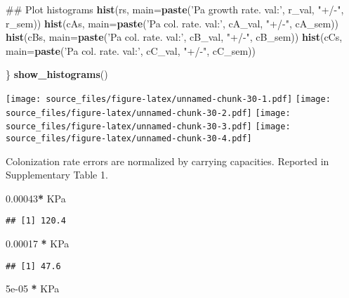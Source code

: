 \documentclass[]{article}
\newenvironment{Shaded}{\begin{snugshade}}{\end{snugshade}}
\newcommand{\KeywordTok}[1]{\textcolor[rgb]{0.13,0.29,0.53}{\textbf{#1}}}
\newcommand{\DataTypeTok}[1]{\textcolor[rgb]{0.13,0.29,0.53}{#1}}
\newcommand{\FloatTok}[1]{\textcolor[rgb]{0.00,0.00,0.81}{#1}}
\newcommand{\StringTok}[1]{\textcolor[rgb]{0.31,0.60,0.02}{#1}}
\newcommand{\OperatorTok}[1]{\textcolor[rgb]{0.81,0.36,0.00}{\textbf{#1}}}
\newcommand{\NormalTok}[1]{#1}
\begin{document}
\begin{Shaded}
\begin{Highlighting}[]
\NormalTok{  ## Plot histograms}
  \KeywordTok{hist}\NormalTok{(rs, }\DataTypeTok{main=}\KeywordTok{paste}\NormalTok{(}\StringTok{'Pa growth rate. val:'}\NormalTok{, r_val, }\StringTok{"+/-"}\NormalTok{, r_sem))}
  \KeywordTok{hist}\NormalTok{(cAs, }\DataTypeTok{main=}\KeywordTok{paste}\NormalTok{(}\StringTok{'Pa col. rate. val:'}\NormalTok{, cA_val, }\StringTok{"+/-"}\NormalTok{, cA_sem))}
  \KeywordTok{hist}\NormalTok{(cBs, }\DataTypeTok{main=}\KeywordTok{paste}\NormalTok{(}\StringTok{'Pa col. rate. val:'}\NormalTok{, cB_val, }\StringTok{"+/-"}\NormalTok{, cB_sem))}
  \KeywordTok{hist}\NormalTok{(cCs, }\DataTypeTok{main=}\KeywordTok{paste}\NormalTok{(}\StringTok{'Pa col. rate. val:'}\NormalTok{, cC_val, }\StringTok{"+/-"}\NormalTok{, cC_sem))}

\NormalTok{\}}
\KeywordTok{show_histograms}\NormalTok{()}
\end{Highlighting}
\end{Shaded}

\texttt{[image: source\_files/figure-latex/unnamed-chunk-30-1.pdf]}
\texttt{[image: source\_files/figure-latex/unnamed-chunk-30-2.pdf]}
\texttt{[image: source\_files/figure-latex/unnamed-chunk-30-3.pdf]}
\texttt{[image: source\_files/figure-latex/unnamed-chunk-30-4.pdf]}

Colonization rate errors are normalized by carrying capacities. Reported
in Supplementary Table 1.

\begin{Shaded}
\begin{Highlighting}[]
\FloatTok{0.00043}\OperatorTok{*}\StringTok{ }\NormalTok{KPa}
\end{Highlighting}
\end{Shaded}

\begin{verbatim}
## [1] 120.4
\end{verbatim}

\begin{Shaded}
\begin{Highlighting}[]
\FloatTok{0.00017} \OperatorTok{*}\StringTok{ }\NormalTok{KPa}
\end{Highlighting}
\end{Shaded}

\begin{verbatim}
## [1] 47.6
\end{verbatim}

\begin{Shaded}
\begin{Highlighting}[]
\FloatTok{5e-05} \OperatorTok{*}\StringTok{ }\NormalTok{KPa}
\end{Highlighting}
\end{Shaded}
\end{document}
